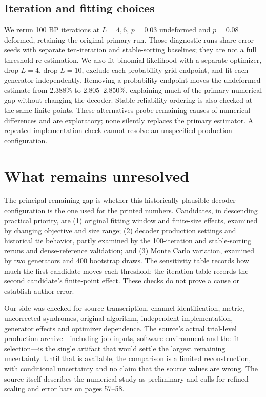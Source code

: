 \subsection{Iteration and fitting choices}

We rerun 100 BP iterations at $L=4,6$, $p=0.03$ undeformed and $p=0.08$ deformed, retaining the original primary run. Those diagnostic runs share error seeds with separate ten-iteration and stable-sorting baselines; they are not a full threshold re-estimation. We also fit binomial likelihood with a separate optimizer, drop $L=4$, drop $L=10$, exclude each probability-grid endpoint, and fit each generator independently. Removing a probability endpoint moves the undeformed estimate from 2.388\% to 2.805--2.850\%, explaining much of the primary numerical gap without changing the decoder. Stable reliability ordering is also checked at the same finite points. These alternatives probe remaining causes of numerical differences and are exploratory; none silently replaces the primary estimator. A repeated implementation check cannot resolve an unspecified production configuration.

\section{What remains unresolved}
The principal remaining gap is whether this historically plausible decoder configuration is the one used for the printed numbers. Candidates, in descending practical priority, are (1) original fitting window and finite-size effects, examined by changing objective and size range; (2) decoder production settings and historical tie behavior, partly examined by the 100-iteration and stable-sorting reruns and dense-reference validation; and (3) Monte Carlo variation, examined by two generators and 400 bootstrap draws. The sensitivity table records how much the first candidate moves each threshold; the iteration table records the second candidate's finite-point effect. These checks do not prove a cause or establish author error.

Our side was checked for source transcription, channel identification, metric, uncorrected syndromes, original algorithm, independent implementation, generator effects and optimizer dependence. The source's actual trial-level production archive---including job inputs, software environment and the fit selection---is the single artifact that would settle the largest remaining uncertainty. Until that is available, the comparison is a limited reconstruction, with conditional uncertainty and no claim that the source values are wrong. The source itself describes the numerical study as preliminary and calls for refined scaling and error bars on pages 57--58.

